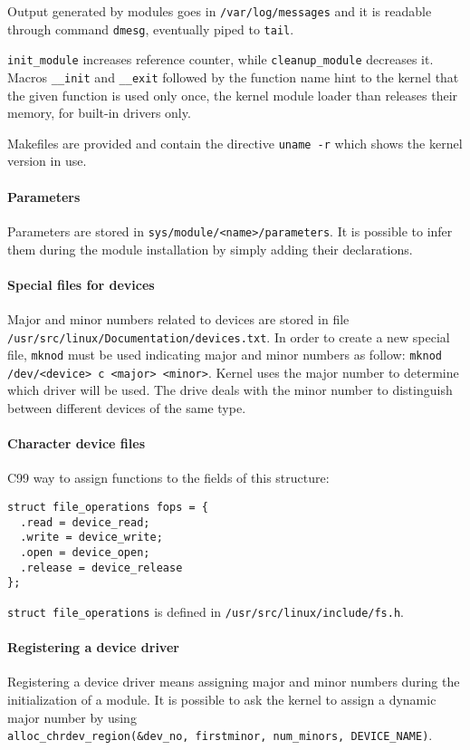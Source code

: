 Output generated by modules goes in \texttt{/var/log/messages} and it is readable through command \texttt{dmesg}, eventually piped to \texttt{tail}.

\texttt{init\_module} increases reference counter, while \texttt{cleanup\_module} decreases it. Macros \texttt{\_\_init} and \texttt{\_\_exit} followed by the function name hint to the kernel that the given function is used only once, the kernel module loader than releases their memory, for built-in drivers only.

Makefiles are provided and contain the directive \texttt{uname -r} which shows the kernel version in use.

\paragraph{Parameters}
Parameters are stored in \texttt{sys/module/<name>/parameters}. It is possible to infer them during the module installation by simply adding their declarations.

\paragraph{Special files for devices} Major and minor numbers related to devices are stored in file
\texttt{/usr/src/linux/Documentation/devices.txt}. In order to create a new special file, \texttt{mknod} must be used indicating major and minor numbers as follow: \texttt{mknod /dev/<device> c <major> <minor>}. Kernel uses the major number to determine which driver will be used. The drive deals with the minor number to distinguish between different devices of the same type.

\paragraph{Character device files}
C99 way to assign functions to the fields of this structure:
\begin{verbatim}
struct file_operations fops = {
  .read = device_read;
  .write = device_write;
  .open = device_open;
  .release = device_release
};
\end{verbatim}
\texttt{struct file\_operations} is defined in \texttt{/usr/src/linux/include/fs.h}.

\paragraph{Registering a device driver}
Registering a device driver means assigning major and minor numbers during the initialization of a module. It is possible to ask the kernel to assign a dynamic major number by using \\
\texttt{alloc\_chrdev\_region(\&dev\_no, firstminor, num\_minors, DEVICE\_NAME)}.

